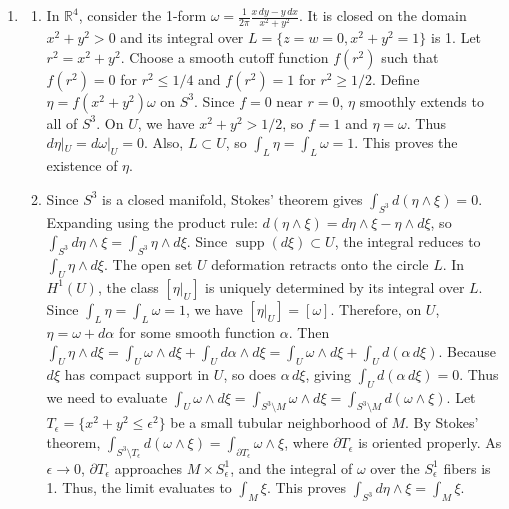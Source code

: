 \documentclass{article}
\begin{document}
\begin{enumerate}[label=\fbox{\arabic*}]
  \item %
        \begin{enumerate}[label=(\arabic*)]
          \item In $\mathbb{R}^4$, consider the 1-form $\omega = \frac{1}{2\pi} \frac{x \, dy - y \, dx}{x^2+y^2}$. It is closed on the domain $x^2+y^2 > 0$ and its integral over $L = \{z=w=0, x^2+y^2=1\}$ is 1.
                Let $r^2 = x^2+y^2$. Choose a smooth cutoff function $f(r^2)$ such that $f(r^2) = 0$ for $r^2 \le 1/4$ and $f(r^2) = 1$ for $r^2 \ge 1/2$.
                Define $\eta = f(x^2+y^2) \omega$ on $S^3$. Since $f=0$ near $r=0$, $\eta$ smoothly extends to all of $S^3$.
                On $U$, we have $x^2+y^2 > 1/2$, so $f=1$ and $\eta = \omega$. Thus $d\eta|_U = d\omega|_U = 0$.
                Also, $L \subset U$, so $\int_L \eta = \int_L \omega = 1$. This proves the existence of $\eta$.
          \item Since $S^3$ is a closed manifold, Stokes' theorem gives $\int_{S^3} d(\eta \wedge \xi) = 0$.
                Expanding using the product rule: $d(\eta \wedge \xi) = d\eta \wedge \xi - \eta \wedge d\xi$, so $\int_{S^3} d\eta \wedge \xi = \int_{S^3} \eta \wedge d\xi$.
                Since $\operatorname{supp}(d\xi) \subset U$, the integral reduces to $\int_U \eta \wedge d\xi$.
                The open set $U$ deformation retracts onto the circle $L$. In $H^1(U)$, the class $[\eta|_U]$ is uniquely determined by its integral over $L$. Since $\int_L \eta = \int_L \omega = 1$, we have $[\eta|_U] = [\omega]$.
                Therefore, on $U$, $\eta = \omega + d\alpha$ for some smooth function $\alpha$.
                Then $\int_U \eta \wedge d\xi = \int_U \omega \wedge d\xi + \int_U d\alpha \wedge d\xi = \int_U \omega \wedge d\xi + \int_U d(\alpha \, d\xi)$.
                Because $d\xi$ has compact support in $U$, so does $\alpha \, d\xi$, giving $\int_U d(\alpha \, d\xi) = 0$.
                Thus we need to evaluate $\int_U \omega \wedge d\xi = \int_{S^3 \setminus M} \omega \wedge d\xi = \int_{S^3 \setminus M} d(\omega \wedge \xi)$.
                Let $T_\epsilon = \{ x^2+y^2 \le \epsilon^2 \}$ be a small tubular neighborhood of $M$.
                By Stokes' theorem, $\int_{S^3 \setminus T_\epsilon} d(\omega \wedge \xi) = \int_{\partial T_\epsilon} \omega \wedge \xi$, where $\partial T_\epsilon$ is oriented properly.
                As $\epsilon \to 0$, $\partial T_\epsilon$ approaches $M \times S^1_\epsilon$, and the integral of $\omega$ over the $S^1_\epsilon$ fibers is 1. Thus, the limit evaluates to $\int_M \xi$.
                This proves $\int_{S^3} d\eta \wedge \xi = \int_M \xi$.
        \end{enumerate}


\end{enumerate}
\end{document}
